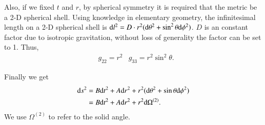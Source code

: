 \documentclass[openany,10pt]{book}
\theoremstyle{definition}
\theoremstyle{definition}
\theoremstyle{remark}
\begin{document}
Also, if we fixed $t$ and $r$, by spherical symmetry it is required that the metric be a 2-D spherical shell. Using knowledge in elementary geometry, the infinitesimal length on a 2-D spherical shell is  ${\rm{d}}l^2=D\cdot r^2({\rm{d}}\theta^2+\sin^2{\theta}{\rm{d}}\phi^2)$. $D$ is an constant factor due to isotropic gravitation, without loss of generality the factor can be set to 1. Thus,
\begin{equation}
\begin{aligned}
      &g_{22}=r^2
      &g_{33}=r^2\sin^2{\theta}.
\end{aligned}
\end{equation}


Finally we get
\begin{equation}
\begin{aligned}
    {\rm{d}}s^2
    &=B{\rm{d}}t^2+A{\rm{d}}r^2+r^2({\rm{d}}\theta^2+\sin{\theta}{\rm{d}}\phi^2)\\
    &=B{\rm{d}}t^2+A{\rm{d}}r^2+r^2{\rm{d}}\Omega^{(2)}.
\end{aligned}
\end{equation}
We use $\Omega^{(2)}$ to refer to the solid angle.
\end{document}
